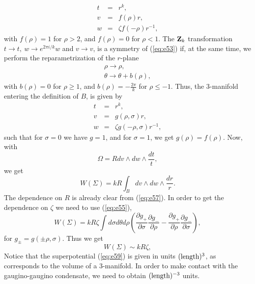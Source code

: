 \begin{eqnarray}
t & = & r^k, \nonumber \\
v & = & f(\rho) r,   \nonumber \\
w & = & \zeta f(-\rho) r^{-1},
\label{eq:e53}
\end{eqnarray}
with $f(\rho)=1$ for $\rho>2$, and $f(\rho)=0$ for $\rho<1$. The
${\bf Z}_k$ transformation $t\rightarrow t, \: w \rightarrow e^{2
\pi i /k}w$ and $v \rightarrow v$, is a symmetry of
(\ref{eq:e53}) if, at the same time, we perform the
reparametrization of the $r$-plane
\begin{eqnarray}
\rho \rightarrow \rho, \nonumber \\
\theta \rightarrow \theta + b(\rho),
\label{eq:e54}
\end{eqnarray}
with $b(\rho)=0$ for $\rho\geq1$, and $b(\rho)=- \frac {2\pi}{k}$
for $\rho\leq -1$. Thus, the $3$-manifold entering the
definition of $B$, is given by
\begin{eqnarray}
t & = & r^k, \nonumber \\
v & = & g(\rho,\sigma) r,   \nonumber \\
w & = & \zeta g(-\rho,\sigma) r^{-1},
\label{eq:e55}
\end{eqnarray}
such that for $\sigma=0$ we have $g=1$, and for $\sigma=1$, we
get $g(\rho)=f(\rho)$. Now, with
\begin{equation}
\Omega = R dv \wedge dw \wedge \frac {dt}{t},
\label{eq:e56}
\end{equation}
we get
\begin{equation}
W(\Sigma) = kR \int_B dv \wedge dw \wedge \frac {dr}{r}.
\label{eq:e57}
\end{equation}
The dependence on $R$ is already clear from (\ref{eq:e57}). In
order to get the dependence on $\zeta$ we need to use
(\ref{eq:e55}),
\begin{equation}
W(\Sigma) = k R \zeta \int d \sigma d \theta d \rho \left( \frac
{\partial g_+}{\partial \sigma} \frac {\partial g_-}{\partial
\rho}- \frac {\partial g_+}{\partial \rho} \frac {\partial g_-}{\partial
\sigma} \right),
\label{eq:e58}
\end{equation}
for $g_{\pm}=g(\pm \rho,\sigma)$. Thus we get
\begin{equation}
W(\Sigma) \sim k R \zeta,
\label{eq:e59}
\end{equation}
Notice that the superpotential (\ref{eq:e59}) is given in units $(\hbox {length})^3$, 
as corresponds to the volume of a $3$-manifold. In order to make contact 
with the gaugino-gaugino condensate, we need to obtain $(\hbox {length})^{-3}$ units. 
